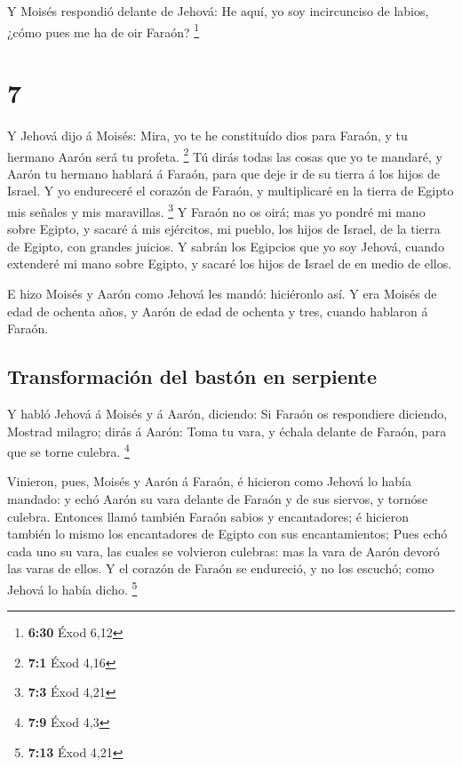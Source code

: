  Y Moisés respondió delante de Jehová: He aquí, yo soy
incircunciso de labios, ¿cómo pues me ha de oir Faraón? \footnote{\textbf{6:30}
  Éxod 6,12}

\hypertarget{section-6}{%
\section{7}\label{section-6}}

 Y Jehová dijo á Moisés: Mira, yo te he constituído dios
para Faraón, y tu hermano Aarón será tu profeta. \footnote{\textbf{7:1}
  Éxod 4,16}  Tú dirás todas las cosas que yo te mandaré,
y Aarón tu hermano hablará á Faraón, para que deje ir de su tierra á los
hijos de Israel.  Y yo endureceré el corazón de Faraón, y
multiplicaré en la tierra de Egipto mis señales y mis maravillas.
\footnote{\textbf{7:3} Éxod 4,21}  Y Faraón no os oirá;
mas yo pondré mi mano sobre Egipto, y sacaré á mis ejércitos, mi pueblo,
los hijos de Israel, de la tierra de Egipto, con grandes juicios.
 Y sabrán los Egipcios que yo soy Jehová, cuando extenderé
mi mano sobre Egipto, y sacaré los hijos de Israel de en medio de ellos.

 E hizo Moisés y Aarón como Jehová les mandó: hiciéronlo
así.  Y era Moisés de edad de ochenta años, y Aarón de
edad de ochenta y tres, cuando hablaron á Faraón.

\hypertarget{transformaciuxf3n-del-bastuxf3n-en-serpiente}{%
\subsection{Transformación del bastón en
serpiente}\label{transformaciuxf3n-del-bastuxf3n-en-serpiente}}

 Y habló Jehová á Moisés y á Aarón, diciendo:
 Si Faraón os respondiere diciendo, Mostrad milagro; dirás
á Aarón: Toma tu vara, y échala delante de Faraón, para que se torne
culebra. \footnote{\textbf{7:9} Éxod 4,3}

 Vinieron, pues, Moisés y Aarón á Faraón, é hicieron como
Jehová lo había mandado: y echó Aarón su vara delante de Faraón y de sus
siervos, y tornóse culebra.  Entonces llamó también
Faraón sabios y encantadores; é hicieron también lo mismo los
encantadores de Egipto con sus encantamientos;  Pues echó
cada uno su vara, las cuales se volvieron culebras: mas la vara de Aarón
devoró las varas de ellos.  Y el corazón de Faraón se
endureció, y no los escuchó; como Jehová lo había dicho. \footnote{\textbf{7:13}
  Éxod 4,21}

